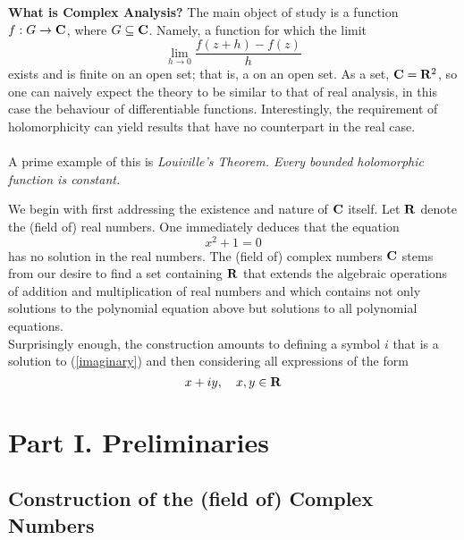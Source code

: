 
{\bf \large What is Complex Analysis?} The main object of study is a  function $f: G \to \mathbf C$, where $G \subseteq \mathbf C$. Namely, a function for which the limit
\[\lim_{h\to 0}\frac{f(z+h) - f(z)}{h}\]
exists and is finite on an open set; that is, a  on an open set. As a set, $\mathbf C = \mathbf R^2$, so one can naively expect the theory to be similar to that of real analysis, in this case the behaviour of differentiable functions. Interestingly, the requirement of holomorphicity can yield results that have no counterpart in the real case.\\
\\
A prime example of this is \emph{Louiville's Theorem. Every bounded holomorphic function is constant.}

\medskip

\begin{discussion}
We begin with first addressing the existence and nature of $\mathbf C$ itself. Let $\mathbf R$ denote the (field of) real numbers. One immediately deduces that the equation
\begin{equation*}\label{imaginary}
x^2 + 1 = 0\tag{$*$}
\end{equation*}
has no solution in the real numbers. The (field of) complex numbers $\mathbf C$ stems from our desire to find a set containing $\mathbf R$ that extends the algebraic operations of addition and multiplication of real numbers and which contains not only solutions to the polynomial equation above but solutions to all polynomial equations.\\[0.5em]
Surprisingly enough, the construction amounts to defining a symbol $i$ that is a solution to (\ref{imaginary}) and then considering all expressions of the form
\[x + iy,\quad x,y \in \mathbf R\]
\end{discussion}

\bigskip

\section{Part I. Preliminaries}
\subsection{Construction of the (field of) Complex Numbers}
%

